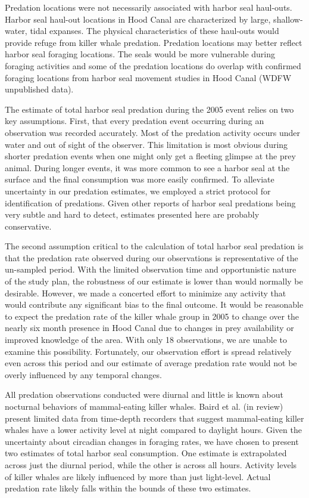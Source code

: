 Predation locations were not necessarily associated with harbor seal
haul-outs. Harbor seal haul-out locations in Hood Canal are
characterized by large, shallow-water, tidal expanses. The physical
characteristics of these haul-outs would provide refuge from killer
whale predation. Predation locations may better reflect harbor seal
foraging locations. The seals would be more vulnerable during foraging
activities and some of the predation locations do overlap with confirmed
foraging locations from harbor seal movement studies in Hood Canal (WDFW
unpublished data).

The estimate of total harbor seal predation during the 2005 event relies
on two key assumptions. First, that every predation event occurring
during an observation was recorded accurately. Most of the predation
activity occurs under water and out of sight of the observer. This
limitation is most obvious during shorter predation events when one
might only get a fleeting glimpse at the prey animal. During longer
events, it was more common to see a harbor seal at the surface and the
final consumption was more easily confirmed. To alleviate uncertainty in
our predation estimates, we employed a strict protocol for
identification of predations. Given other reports of harbor seal
predations being very subtle and hard to detect, estimates presented
here are probably conservative.

The second assumption critical to the calculation of total harbor seal
predation is that the predation rate observed during our observations is
representative of the un-sampled period. With the limited observation
time and opportunistic nature of the study plan, the robustness of our
estimate is lower than would normally be desirable. However, we made a
concerted effort to minimize any activity that would contribute any
significant bias to the final outcome. It would be reasonable to expect
the predation rate of the killer whale group in 2005 to change over the
nearly six month presence in Hood Canal due to changes in prey
availability or improved knowledge of the area. With only 18
observations, we are unable to examine this possibility. Fortunately,
our observation effort is spread relatively even across this period and
our estimate of average predation rate would not be overly influenced by
any temporal changes.

All predation observations conducted were diurnal and little is known
about nocturnal behaviors of mammal-eating killer whales. Baird et al.
(in review) present limited data from time-depth recorders that suggest
mammal-eating killer whales have a lower activity level at night
compared to daylight hours. Given the uncertainty about circadian
changes in foraging rates, we have chosen to present two estimates of
total harbor seal consumption. One estimate is extrapolated across just
the diurnal period, while the other is across all hours. Activity levels
of killer whales are likely influenced by more than just light-level.
Actual predation rate likely falls within the bounds of these two
estimates.

